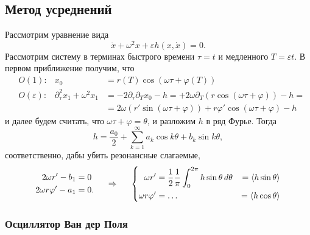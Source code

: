 \subsection{Метод усреднений}

Рассмотрим уравнение вида
\begin{equation*}
    \ddot{x} + \omega^2 x + \varepsilon h(x, \dot{x}) = 0.
\end{equation*}
Рассмотрим систему в терминах быстрого времени $\tau = t$ и медленного $T = \varepsilon t$. В первом приближение получим, что 
\begin{align*}
    &O(1) \colon &x_0 &= r(T) \cos (\omega \tau + \varphi(T)) \\
    &O(\varepsilon)\colon 
    &\partial_\tau^2 x_1 + \omega^2 x_1 
    &=
     - 2 \partial_\tau \partial_T x_0 - h = 
     + 2 \omega \partial_T (r \cos (\omega \tau + \varphi)) - h 
     = \\
    &&&= 2 \omega (r' \sin (\omega \tau + \varphi)) +  r \varphi' \cos (\omega \tau + \varphi) - h
\end{align*}
и далее будем считать, что $\omega \tau + \varphi = \theta$, и разложим $h$ в ряд Фурье. Тогда
\begin{equation*}
    h = \frac{a_0}{2} + \sum_{k=1}^{\infty} a_k \cos k \theta + b_k \sin k \theta,
\end{equation*}
соответственно, дабы убить резонансные слагаемые,
\begin{equation*}
    \begin{aligned}
        2 \omega r' - b_1 &= 0 \\
        2 \omega r \varphi' - a_1 &= 0.
    \end{aligned}
    \hspace{0.5cm} \Rightarrow \hspace{0.5cm}
    \left\{\begin{aligned}
        \omega r' &= \frac{1}{2} \frac{1}{\pi} \int_0^{2\pi} h \sin \theta \, d \theta &= \langle h \sin  \theta \rangle \\
        \omega r \varphi' &=\ldots&= \langle h \cos \theta \rangle
    \end{aligned}\right.
\end{equation*}

\subsubsection*{Осциллятор Ван дер Поля}

